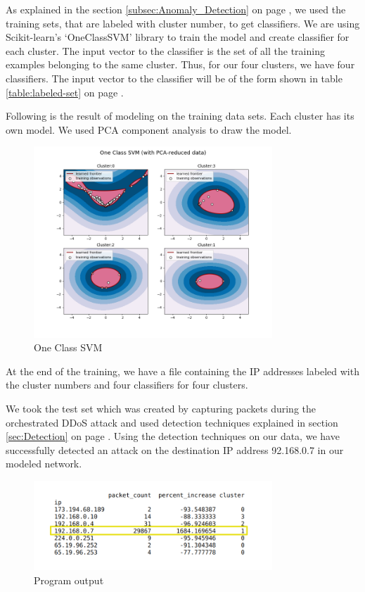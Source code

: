 \documentclass[12pt,oneside,a4paper]{article}
\begin{document}
As explained in the section \ref{subsec:Anomaly_Detection} on page \pageref{subsec:Anomaly_Detection}, we used the training sets, that are labeled with cluster number, to get classifiers. We are using Scikit-learn's `OneClassSVM' library to train the model and create classifier for each cluster. The input vector to the classifier is the set of all the training examples belonging to the same cluster. Thus, for our four clusters, we have four classifiers. The input vector to the classifier will be of the form shown in table \ref{table:labeled-set} on page \pageref{table:labeled-set}.

Following is the result of modeling on the training data sets. Each cluster has its own model. We used PCA component analysis to draw the model.

\begin{figure}[H]
\centering
\includegraphics[width=0.80\textwidth]{one-class-SVM.png}
\caption{One Class SVM} \label{fig:one-class-SVM}
\end{figure}

At the end of the training, we have a file containing the IP addresses labeled with the cluster numbers and four classifiers for four clusters.

We took the test set which was created by capturing packets during the orchestrated DDoS attack and used detection techniques explained in section \ref{sec:Detection} on page \pageref{sec:Detection}. Using the detection techniques on our data, we have successfully detected an attack on the destination IP address 92.168.0.7 in our modeled network.

\begin{figure}[H]
\centering
\includegraphics[width=0.80\textwidth]{detected_IP.png}
\caption{Program output} \label{fig:detected_IP}
\end{figure}
\end{document}
